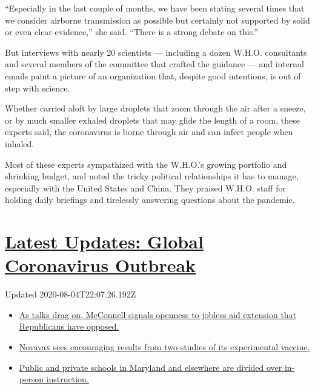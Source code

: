 ``Especially in the last couple of months, we have been stating several
times that we consider airborne transmission as possible but certainly
not supported by solid or even clear evidence,'' she said. ``There is a
strong debate on this.''

But interviews with nearly 20 scientists --- including a dozen W.H.O.
consultants and several members of the committee that crafted the
guidance --- and internal emails paint a picture of an organization
that, despite good intentions, is out of step with science.

Whether carried aloft by large droplets that zoom through the air after
a sneeze, or by much smaller exhaled droplets that may glide the length
of a room, these experts said, the coronavirus is borne through air and
can infect people when inhaled.

Most of these experts sympathized with the W.H.O.'s growing portfolio
and shrinking budget, and noted the tricky political relationships it
has to manage, especially with the United States and China. They praised
W.H.O. staff for holding daily briefings and tirelessly answering
questions about the pandemic.

\hypertarget{latest-updates-global-coronavirus-outbreak}{%
\section{\texorpdfstring{\href{https://www.nytimes3xbfgragh.onion/2020/08/04/world/coronavirus-cases.html?action=click\&pgtype=Article\&state=default\&region=MAIN_CONTENT_1\&context=storylines_live_updates}{Latest
Updates: Global Coronavirus
Outbreak}}{Latest Updates: Global Coronavirus Outbreak}}\label{latest-updates-global-coronavirus-outbreak}}

Updated 2020-08-04T22:07:26.192Z

\begin{itemize}
\tightlist
\item
  \href{https://www.nytimes3xbfgragh.onion/2020/08/04/world/coronavirus-cases.html?action=click\&pgtype=Article\&state=default\&region=MAIN_CONTENT_1\&context=storylines_live_updates\#link-2daa96b5}{As
  talks drag on, McConnell signals openness to jobless aid extension
  that Republicans have opposed.}
\item
  \href{https://www.nytimes3xbfgragh.onion/2020/08/04/world/coronavirus-cases.html?action=click\&pgtype=Article\&state=default\&region=MAIN_CONTENT_1\&context=storylines_live_updates\#link-1228a480}{Novavax
  sees encouraging results from two studies of its experimental
  vaccine.}
\item
  \href{https://www.nytimes3xbfgragh.onion/2020/08/04/world/coronavirus-cases.html?action=click\&pgtype=Article\&state=default\&region=MAIN_CONTENT_1\&context=storylines_live_updates\#link-4825b93}{Public
  and private schools in Maryland and elsewhere are divided over
  in-person instruction.}
\end{itemize}


